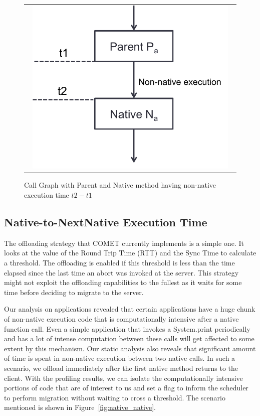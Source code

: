 \begin{figure} [thf*]
\centering
\begin{tabular}{c}
\begin{minipage}[b]{0.5\textwidth}
\includegraphics[width=0.95\textwidth]{figs/parent_native.pdf}
\end{minipage}
\end{tabular}
\caption{Call Graph with Parent and Native method having non-native execution time $t2-t1$}
\label{fig:parent_native}
\end{figure}
\subsection{Native-to-NextNative Execution Time}
The offloading strategy that COMET currently implements is a simple one. It looks at the value of the Round Trip Time (RTT) and
the Sync Time to calculate a threshold. The offloading is enabled if this threshold is less than the time elapsed since the last
time an abort was invoked at the server. This strategy might not exploit the offloading capabilities to the fullest as it waits for
some time before deciding to migrate to the server.

Our analysis on applications revealed that certain applications have a huge chunk of non-native execution code that is computationally
intensive after a native function call. Even a simple application that invokes a System.print periodically and has a lot of intense
computation between these calls will get affected to some extent by this mechanism. Our static analysis also reveals that significant
amount of time is spent in non-native execution between two native calls. In such a scenario, we offload immediately after the first
native method returns to the client. With the profiling results, we can isolate the computationally intensive portions of code that
are of interest to us and set a flag to inform the scheduler to perform migration without waiting to cross a threshold. The scenario
mentioned is shown in Figure~\ref{fig:native_native}.

